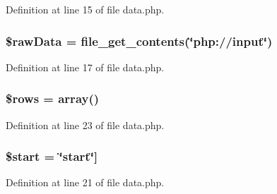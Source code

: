 \-Definition at line 15 of file data.\-php.

\hypertarget{administration_2lists_2data_8php_ad66cfed6c1f454fbc3f3c6fdc8842a7b}{
\subsubsection[{\$raw\-Data}]{\setlength{\rightskip}{0pt plus 5cm}\$raw\-Data = file\-\_\-get\-\_\-contents(\char`\"{}php\-://input\char`\"{})}}\label{administration_2lists_2data_8php_ad66cfed6c1f454fbc3f3c6fdc8842a7b}


\-Definition at line 17 of file data.\-php.

\hypertarget{administration_2lists_2data_8php_ace2ec39e7df3899fa8df9640ec274b03}{
\subsubsection[{\$rows}]{\setlength{\rightskip}{0pt plus 5cm}\$rows = array()}}\label{administration_2lists_2data_8php_ace2ec39e7df3899fa8df9640ec274b03}


\-Definition at line 23 of file data.\-php.

\hypertarget{administration_2lists_2data_8php_a50a00e7de77365e00b117e73aa82fb9b}{
\subsubsection[{\$start}]{\setlength{\rightskip}{0pt plus 5cm}\$start = \char`\"{}start\char`\"{}\mbox{]}}}\label{administration_2lists_2data_8php_a50a00e7de77365e00b117e73aa82fb9b}


\-Definition at line 21 of file data.\-php.

